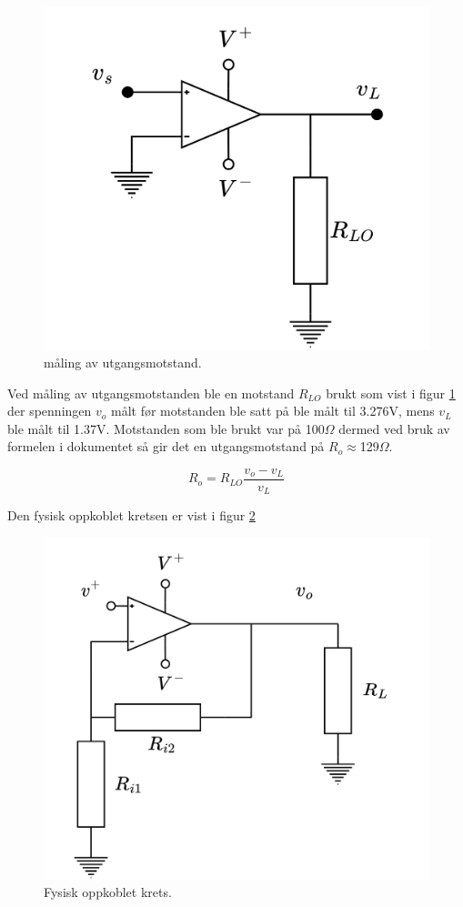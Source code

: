 \begin{figure}[H]
    \centering
    \includegraphics[scale=0.1]{./Images/03Research/outmot.png}
    \caption{måling av utgangsmotstand.\cite{pham_2022_selvlaget}}
    \label{fig:outmot}
\end{figure}

Ved måling av utgangsmotstanden ble en motstand $R_{LO}$ brukt som vist i figur \ref{fig:outmot} der spenningen $v_o$ målt før motstanden ble satt på ble målt til 3.276V, mens $v_L$ ble målt til 1.37V. Motstanden som ble brukt var på 100$\Omega$ dermed ved bruk av formelen i dokumentet \cite{ntnu_2022_ttt4265} så gir det en utgangsmotstand på $R_o\approx$129$\Omega$.

\begin{equation}
    R_o=R_{LO}\frac{v_o-v_L}{v_L}
\end{equation}

Den fysisk oppkoblet kretsen er vist i figur \ref{fig:fysisk}
\begin{figure}[H]
	\centering
	\includegraphics[scale=0.2]{./Images/03Research/ikkeinverterende.png}
	\caption{Fysisk oppkoblet krets.}
	\label{fig:fysisk}
\end{figure}



